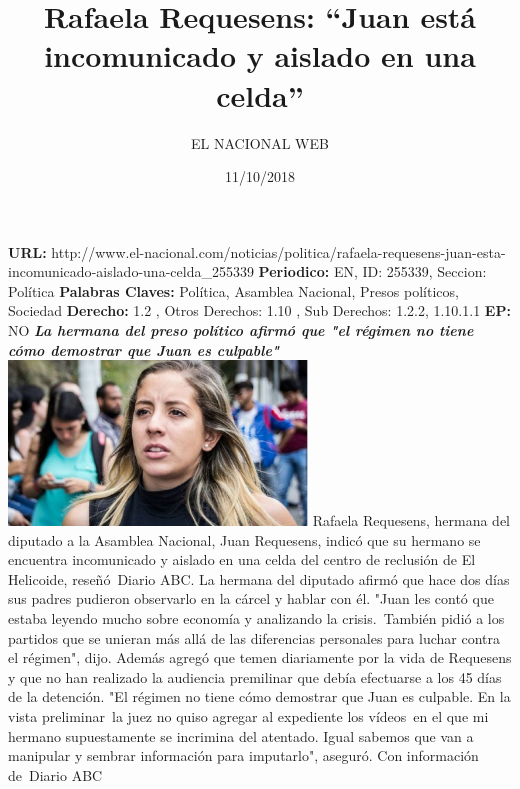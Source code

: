 \documentclass{article}%
\title{\textbf{Rafaela Requesens: “Juan está incomunicado y aislado en una celda”}}%
\author{EL NACIONAL WEB}%
\date{11/10/2018}%
\begin{document}
%
\normalsize%
\maketitle%
\textbf{URL: }%
http://www.el{-}nacional.com/noticias/politica/rafaela{-}requesens{-}juan{-}esta{-}incomunicado{-}aislado{-}una{-}celda\_255339\newline%
%
\textbf{Periodico: }%
EN, %
ID: %
255339, %
Seccion: %
Política\newline%
%
\textbf{Palabras Claves: }%
Política, Asamblea Nacional, Presos políticos, Sociedad\newline%
%
\textbf{Derecho: }%
1.2%
, Otros Derechos: %
1.10%
, Sub Derechos: %
1.2.2, 1.10.1.1%
\newline%
%
\textbf{EP: }%
NO\newline%
\newline%
%
\textbf{\textit{La hermana del preso político afirmó que "el régimen no tiene cómo demostrar que Juan es culpable"}}%
\newline%
\newline%
%
\includegraphics[width=300px]{193.jpg}%
\newline%
%
Rafaela Requesens, hermana del diputado a la Asamblea Nacional, Juan Requesens, indicó que su hermano se encuentra incomunicado y aislado en una celda del centro de reclusión de El Helicoide, reseñó~Diario ABC.%
\newline%
%
La hermana del diputado afirmó que hace dos días sus padres pudieron observarlo en la cárcel y hablar con él. "Juan les contó que estaba leyendo mucho sobre economía y analizando la crisis.~También pidió a los partidos que se unieran más allá de las diferencias personales para luchar contra el régimen", dijo.%
\newline%
%
Además agregó que temen diariamente por la vida de Requesens y que no han realizado la audiencia premilinar que debía efectuarse a los 45 días de la detención.%
\newline%
%
"El régimen no tiene cómo demostrar que Juan es culpable. En la vista preliminar~la juez no quiso agregar al expediente los vídeos~en el que mi hermano supuestamente se incrimina del atentado. Igual sabemos que van a manipular y sembrar información para imputarlo", aseguró.%
\newline%
%
Con información de~Diario ABC%
\newline%
%
\end{document}
